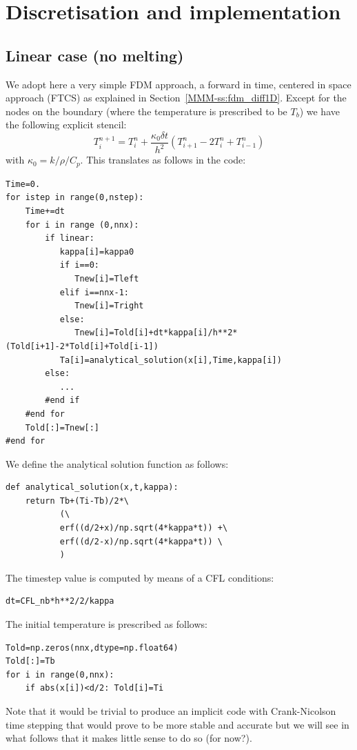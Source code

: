 \section*{Discretisation and implementation}

\subsection*{Linear case (no melting)}

We adopt here a very simple FDM approach, a forward in time, 
centered in space approach (FTCS) as explained in Section~\ref{MMM-ss:fdm_diff1D}. 
Except for the nodes on the boundary (where the temperature
is prescribed to be $T_b$) we have the following explicit stencil:
\[
T_i^{n+1} 
= 
T_i^n + \frac{\kappa_0 \delta t }{h^2} (T_{i+1}^n-2T_i^n+T_{i-1}^n)
\]
with $\kappa_0=k/\rho/C_p$. This translates as follows in the code:

\begin{lstlisting}
Time=0.
for istep in range(0,nstep):
    Time+=dt
    for i in range (0,nnx):
        if linear:
           kappa[i]=kappa0
           if i==0:
              Tnew[i]=Tleft
           elif i==nnx-1:
              Tnew[i]=Tright
           else:
              Tnew[i]=Told[i]+dt*kappa[i]/h**2*(Told[i+1]-2*Told[i]+Told[i-1])
           Ta[i]=analytical_solution(x[i],Time,kappa[i])
        else:
           ...
        #end if
    #end for
    Told[:]=Tnew[:]
#end for
\end{lstlisting}
We define the analytical solution function as follows:
\begin{lstlisting}
def analytical_solution(x,t,kappa):
    return Tb+(Ti-Tb)/2*\
           (\
           erf((d/2+x)/np.sqrt(4*kappa*t)) +\
           erf((d/2-x)/np.sqrt(4*kappa*t)) \
           )
\end{lstlisting}
The timestep value is computed by means of a CFL conditions:
\begin{lstlisting}
dt=CFL_nb*h**2/2/kappa
\end{lstlisting}
The initial temperature is prescribed as follows:
\begin{lstlisting}
Told=np.zeros(nnx,dtype=np.float64)
Told[:]=Tb
for i in range(0,nnx):
    if abs(x[i])<d/2: Told[i]=Ti
\end{lstlisting}

Note that it would be trivial to produce an implicit code with Crank-Nicolson 
time stepping that would prove to be more stable and accurate but we will 
see in what follows that it makes little sense to do so (for now?).


